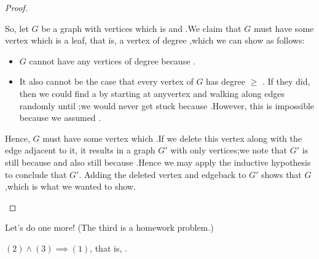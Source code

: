 \documentclass{tufte-handout}
\begin{document}
\begin{proof}
\begin{itemize}
    So, let $G$ be a graph with \blank vertices which is\linebreak
    \mbox{}\blank and \blank.\linebreak  We claim that $G$
    must have some vertex which is a leaf, that is, a vertex of degree
    \blank,\newline which we can show as follows:
    \begin{itemize}
    \item $G$ cannot have any vertices of degree \blank\linebreak because
      \blank.
    \item It also cannot be the case that every vertex of $G$ has
      degree $\geq$ \blank.  If they did, then we could find a \blank
      by starting at any\linebreak vertex and walking along edges
      randomly until \blank;\linebreak we would never get stuck
      because \blank.\linebreak However, this is impossible because we
      assumed \blank.
    \end{itemize}
    Hence, $G$ must have some vertex which \blank.\linebreak If we
    delete this vertex along with the edge adjacent to it, it results
    in a graph $G'$ with only \blank vertices;\linebreak we note that
    $G'$ is still \blank\linebreak because \blank\linebreak and also still
    \blank\linebreak because \blank.\linebreak  Hence we may apply the
    inductive hypothesis to conclude that $G'$\linebreak \mbox{}\blank.
    Adding the deleted vertex and edge\linebreak back to $G'$ shows that $G$
    \blank,\linebreak which is what we wanted to show.
  \end{itemize}
\end{proof}

Let's do one more!  (The third is a homework problem.)

\begin{lem}
  $(2) \land (3) \implies (1)$, that is, \blank\linebreak \mbox{}\blank.
\end{lem}
\end{document}
